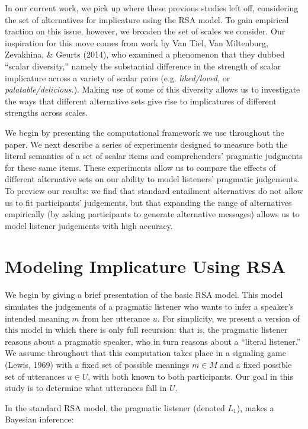 \documentclass[10pt, letterpaper]{article}
\begin{document}
In our current work, we pick up where these previous studies left off,
considering the set of alternatives for implicature using the RSA model.
To gain empirical traction on this issue, however, we broaden the set of
scales we consider. Our inspiration for this move comes from work by Van
Tiel, Van Miltenburg, Zevakhina, \& Geurts (2014), who examined a
phenomenon that they dubbed ``scalar diversity,'' namely the substantial
difference in the strength of scalar implicature across a variety of
scalar pairs (e.g. \emph{liked/loved,} or \emph{palatable/delicious.}).
Making use of some of this diversity allows us to investigate the ways
that different alternative sets give rise to implicatures of different
strengths across scales.

We begin by presenting the computational framework we use throughout the
paper. We next describe a series of experiments designed to measure both
the literal semantics of a set of scalar items and comprehenders'
pragmatic judgments for these same items. These experiments allow us to
compare the effects of different alternative sets on our ability to
model listeners' pragmatic judgements. To preview our results: we find
that standard entailment alternatives do not allow us to fit
participants' judgements, but that expanding the range of alternatives
empirically (by asking participants to generate alternative messages)
allows us to model listener judgements with high accuracy.

\section{Modeling Implicature Using
RSA}\label{modeling-implicature-using-rsa}

We begin by giving a brief presentation of the basic RSA model. This
model simulates the judgements of a pragmatic listener who wants to
infer a speaker's intended meaning \(m\) from her utterance \(u\). For
simplicity, we present a version of this model in which there is only
full recursion: that is, the pragmatic listener reasons about a
pragmatic speaker, who in turn reasons about a ``literal listener.'' We
assume throughout that this computation takes place in a signaling game
(Lewis, 1969) with a fixed set of possible meanings \(m \in M\) and a
fixed possible set of utterances \(u \in U\), with both known to both
participants. Our goal in this study is to determine what utterances
fall in \(U\).

In the standard RSA model, the pragmatic listener (denoted \(L_1\)),
makes a Bayesian inference:
\end{document}
